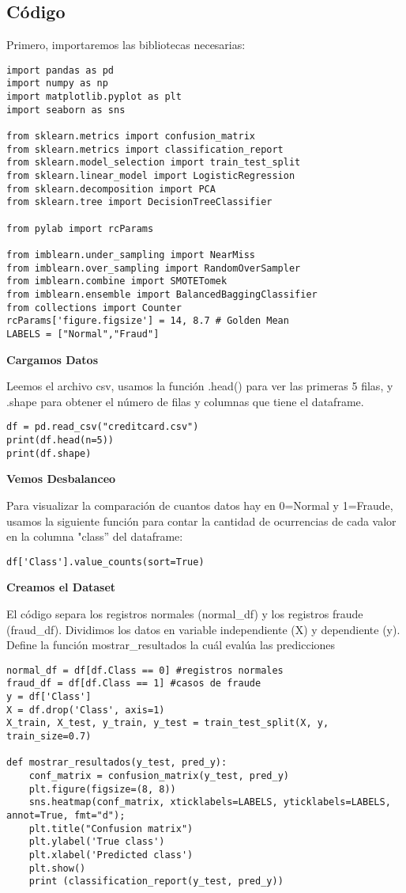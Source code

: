 \documentclass{article}
\begin{document}
\subsection{Código}
Primero, importaremos las bibliotecas necesarias: 
\begin{lstlisting}
import pandas as pd
import numpy as np
import matplotlib.pyplot as plt
import seaborn as sns

from sklearn.metrics import confusion_matrix
from sklearn.metrics import classification_report
from sklearn.model_selection import train_test_split
from sklearn.linear_model import LogisticRegression
from sklearn.decomposition import PCA
from sklearn.tree import DecisionTreeClassifier

from pylab import rcParams

from imblearn.under_sampling import NearMiss
from imblearn.over_sampling import RandomOverSampler
from imblearn.combine import SMOTETomek
from imblearn.ensemble import BalancedBaggingClassifier
from collections import Counter
rcParams['figure.figsize'] = 14, 8.7 # Golden Mean
LABELS = ["Normal","Fraud"]

\end{lstlisting}

\textbf{Cargamos Datos}

Leemos el archivo csv, usamos la función .head() para ver las primeras 5 filas, y .shape para obtener el número de filas y columnas que tiene el dataframe.
\begin{lstlisting}
df = pd.read_csv("creditcard.csv")
print(df.head(n=5)) 
print(df.shape)
\end{lstlisting}

\textbf{Vemos Desbalanceo}

Para visualizar la comparación de cuantos datos hay en 0=Normal y 1=Fraude, usamos la siguiente función para contar la cantidad de ocurrencias de cada valor en la columna  "class'' del dataframe: 
\begin{lstlisting}
df['Class'].value_counts(sort=True)
\end{lstlisting}

\textbf{Creamos el Dataset}


El código separa los registros normales (normal\_df) y los registros fraude (fraud\_df). Dividimos los datos en variable independiente (X) y dependiente (y).
Define la función mostrar\_resultados la cuál evalúa las predicciones

\begin{lstlisting}
normal_df = df[df.Class == 0] #registros normales
fraud_df = df[df.Class == 1] #casos de fraude
y = df['Class']
X = df.drop('Class', axis=1)
X_train, X_test, y_train, y_test = train_test_split(X, y, train_size=0.7)

def mostrar_resultados(y_test, pred_y):
    conf_matrix = confusion_matrix(y_test, pred_y)
    plt.figure(figsize=(8, 8))
    sns.heatmap(conf_matrix, xticklabels=LABELS, yticklabels=LABELS, annot=True, fmt="d");
    plt.title("Confusion matrix")
    plt.ylabel('True class')
    plt.xlabel('Predicted class')
    plt.show()
    print (classification_report(y_test, pred_y))
\end{lstlisting}
\end{document}
